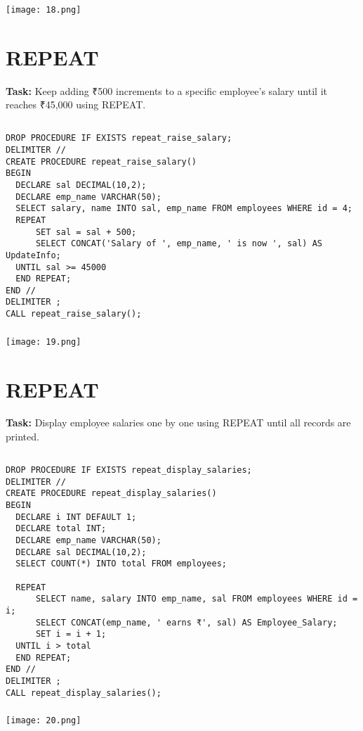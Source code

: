 \documentclass[12pt,a4paper]{article}
\begin{document}
\subsubsection{}
\begin{center}
    \texttt{[image: 18.png]}
\end{center}


\section{REPEAT}
\textbf{Task:} Keep adding ₹500 increments to a specific employee’s salary until it reaches
₹45,000 using REPEAT.

\subsection{}
\begin{lstlisting}
DROP PROCEDURE IF EXISTS repeat_raise_salary;
DELIMITER //
CREATE PROCEDURE repeat_raise_salary()
BEGIN
  DECLARE sal DECIMAL(10,2);
  DECLARE emp_name VARCHAR(50);
  SELECT salary, name INTO sal, emp_name FROM employees WHERE id = 4;
  REPEAT
      SET sal = sal + 500;
      SELECT CONCAT('Salary of ', emp_name, ' is now ', sal) AS UpdateInfo;
  UNTIL sal >= 45000
  END REPEAT;
END //
DELIMITER ;
CALL repeat_raise_salary();

\end{lstlisting}

\subsubsection{}
\begin{center}
    \texttt{[image: 19.png]}
\end{center}


\section{REPEAT}
\textbf{Task:} Display employee salaries one by one using REPEAT until all records are printed.

\subsection{}
\begin{lstlisting}
DROP PROCEDURE IF EXISTS repeat_display_salaries;
DELIMITER //
CREATE PROCEDURE repeat_display_salaries()
BEGIN
  DECLARE i INT DEFAULT 1;
  DECLARE total INT;
  DECLARE emp_name VARCHAR(50);
  DECLARE sal DECIMAL(10,2);
  SELECT COUNT(*) INTO total FROM employees;

  REPEAT
      SELECT name, salary INTO emp_name, sal FROM employees WHERE id = i;
      SELECT CONCAT(emp_name, ' earns ₹', sal) AS Employee_Salary;
      SET i = i + 1;
  UNTIL i > total
  END REPEAT;
END //
DELIMITER ;
CALL repeat_display_salaries();

\end{lstlisting}

\subsubsection{}
\begin{center}
    \texttt{[image: 20.png]}
\end{center}
\end{document}
